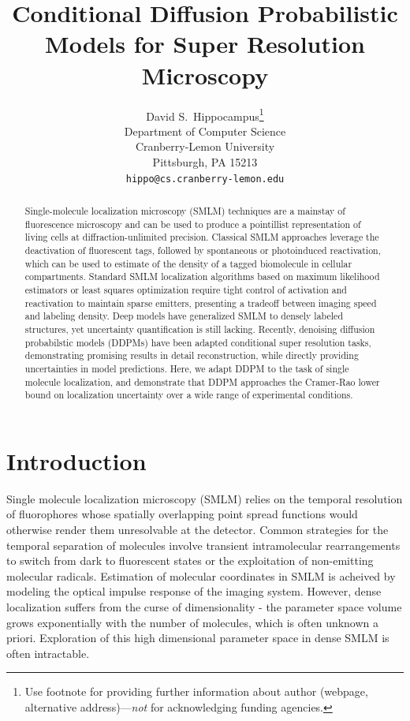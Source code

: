 \documentclass{article}
\title{Conditional Diffusion Probabilistic Models for Super Resolution Microscopy}
\author{%
  David S.~Hippocampus\thanks{Use footnote for providing further information
    about author (webpage, alternative address)---\emph{not} for acknowledging
    funding agencies.} \\
  Department of Computer Science\\
  Cranberry-Lemon University\\
  Pittsburgh, PA 15213 \\
  \texttt{hippo@cs.cranberry-lemon.edu} \\
}
\begin{document}
\maketitle


\begin{abstract}
Single-molecule localization microscopy (SMLM) techniques are a mainstay of fluorescence microscopy and can be used to produce a pointillist representation of living cells at diffraction-unlimited precision. Classical SMLM approaches leverage the deactivation of fluorescent tags, followed by spontaneous or photoinduced reactivation, which can be used to estimate of the density of a tagged biomolecule in cellular compartments. Standard SMLM localization algorithms based on maximum likelihood estimators or least squares optimization require tight control of activation and reactivation to maintain sparse emitters, presenting a tradeoff between imaging speed and labeling density. Deep models have generalized SMLM to densely labeled structures, yet uncertainty quantification is still lacking. Recently, denoising diffusion probabilstic models (DDPMs) have been adapted conditional super resolution tasks, demonstrating promising results in detail reconstruction, while directly providing uncertainties in model predictions. Here, we adapt DDPM to the task of single molecule localization, and demonstrate that DDPM approaches the Cramer-Rao lower bound on localization uncertainty over a wide range of experimental conditions.
\end{abstract}

\section{Introduction}
Single molecule localization microscopy (SMLM) relies on the temporal resolution of fluorophores whose spatially overlapping point spread functions would otherwise render them unresolvable at the detector. Common strategies for the temporal separation of molecules involve transient intramolecular rearrangements to switch from dark to fluorescent states or the exploitation of non-emitting molecular radicals. Estimation of molecular coordinates in SMLM is acheived by modeling the optical impulse response of the imaging system. However, dense localization suffers from the curse of dimensionality - the parameter space volume grows exponentially with the number of molecules, which is often unknown a priori. Exploration of this high dimensional parameter space in dense SMLM is often intractable. 
\end{document}
